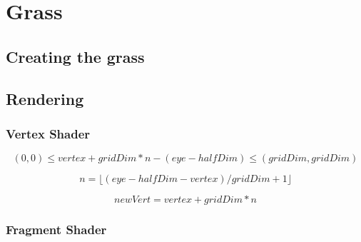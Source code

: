 \chapter{Grass}



\section{Creating the grass}

\section{Rendering}


\subsection{Vertex Shader}


\begin{displaymath}
  (0, 0) \le vertex + gridDim * n - (eye - halfDim) \le (gridDim, gridDim)
\end{displaymath}

\begin{displaymath}
  n = \lfloor (eye - halfDim - vertex) / gridDim + 1 \rfloor
\end{displaymath}

\begin{displaymath}
  newVert = vertex + gridDim * n
\end{displaymath}







\subsection{Fragment Shader}






